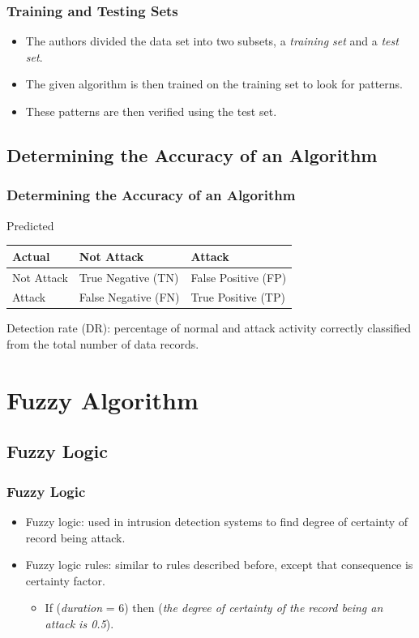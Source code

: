 \documentclass{beamer}
\newcommand{\linespace}{\vskip 0.25cm}
\begin{document}
\begin{frame}
  \frametitle{Training and Testing Sets}
	\begin{itemize}
		\item The authors divided the data set into two subsets, a \emph{training set} and a \emph{test set}.
        \item The given algorithm is then trained on the training set to look for patterns.
        \item These patterns are then verified using the test set.
	\end{itemize}
\end{frame}



\subsection{Determining the Accuracy of an Algorithm}
\begin{frame}
  \frametitle{Determining the Accuracy of an Algorithm}
\begin{table}
Predicted
\begin{tabular}{l|ll}
Actual   & Not Attack & Attack \\ \hline
Not Attack & True Negative (TN) & False Positive (FP) \\
Attack & False Negative (FN) & True Positive (TP)  \\
\end{tabular}
\end{table}
\linespace
\linespace
\begin{center}
Detection rate (DR): percentage of normal and attack activity correctly classified from the total number of data records.
\end{center}
\end{frame}
\section[Fuzzy Algorithm]{Fuzzy Algorithm}
\subsection{Fuzzy Logic}
\begin{frame}
	\frametitle{Fuzzy Logic}
	\begin{itemize}
		\item Fuzzy logic: used in intrusion detection systems to find degree of certainty of record being attack.
		\item Fuzzy logic rules: similar to rules described before, except that
consequence is certainty factor. 
		\begin{itemize}
			\item If (\emph{duration} = 6) then (\emph{the degree of certainty of the record being an attack is 0.5}).
		\end{itemize}
	\end{itemize}
\end{frame}
\end{document}
